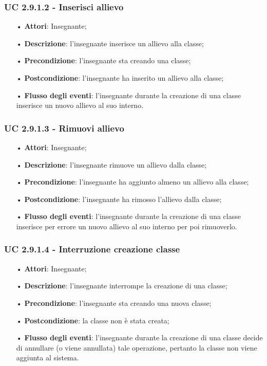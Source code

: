 \subsubsection{UC 2.9.1.2 - Inserisci allievo}
\begin{itemize}
	\item[•] \textbf{Attori}: Insegnante;
	\item[•] \textbf{Descrizione}: l'insegnante inserisce un allievo alla classe;
	\item[•] \textbf{Precondizione}: l'insegnante sta creando una classe;
	\item[•] \textbf{Postcondizione}: l'insegnante ha inserito un allievo alla classe;
	\item[•] \textbf{Flusso degli eventi}: l'insegnante durante la creazione di una classe inserisce un nuovo allievo al suo interno.
\end{itemize}

\subsubsection{UC 2.9.1.3 - Rimuovi allievo}
\begin{itemize}
	\item[•] \textbf{Attori}: Insegnante;
	\item[•] \textbf{Descrizione}: l'insegnante rimuove un allievo dalla classe;
	\item[•] \textbf{Precondizione}: l'insegnante ha aggiunto almeno un allievo alla classe;
	\item[•] \textbf{Postcondizione}: l'insegnante ha rimosso l'allievo dalla classe;
	\item[•] \textbf{Flusso degli eventi}: l'insegnante durante la creazione di una classe inserisce per errore un nuovo allievo al suo interno per poi rimuoverlo.
\end{itemize}

\subsubsection{UC 2.9.1.4 - Interruzione creazione classe}
\begin{itemize}
	\item[•] \textbf{Attori}: Insegnante;
	\item[•] \textbf{Descrizione}: l'insegnante interrompe la creazione di una classe;
	\item[•] \textbf{Precondizione}: l'insegnante sta creando una nuova classe;
	\item[•] \textbf{Postcondizione}: la classe non è stata creata;
	\item[•] \textbf{Flusso degli eventi}: l'insegnante durante la creazione di una classe decide di annullare (o viene annullata) tale operazione, pertanto la classe non viene aggiunta al sistema.
\end{itemize}



